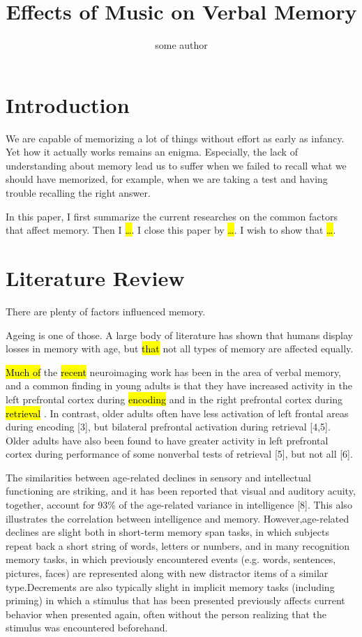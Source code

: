\documentclass{article}
\title{Effects of Music on Verbal Memory}
\author{some author}
\begin{document}
\maketitle{}

\section{Introduction}

We are capable of memorizing a lot of things without effort as early as infancy. Yet how it actually works remains an enigma. Especially, the lack of understanding about memory lead us to suffer when we failed to recall what we should have memorized, for example, when we are taking a test and having trouble recalling the right answer. 

In this paper, I first summarize the current researches on the common factors that affect memory. Then I \hl{\dots}. I close this paper by \hl{\dots}. I wish to show that \hl{\dots}.

\section{Literature Review}

There are plenty of factors influenced memory. 





Ageing is one of those. A large body of literature has shown that humans display losses in memory with age, but \hl{that} not all types of memory are affected equally. 

\hl{Much of}  the \hl{recent}  neuroimaging work has been in the area of verbal memory, and a common finding in young adults is that they have increased activity in the left prefrontal cortex during \hl{encoding}  and in the right prefrontal cortex during \hl{retrieval}  \autocite{cabezaImagingCognitionEmpirical1997,gradyc.l.NeuroimagingActivationFrontal1999}. In contrast, older adults often have less activation of left frontal areas during encoding [3], but bilateral prefrontal activation during retrieval [4,5]. Older adults have also been found to have greater activity in left prefrontal cortex during performance of some nonverbal tests of retrieval [5], but not all [6].

The similarities between age-related declines in sensory and intellectual functioning are striking, and it has been reported that visual and auditory acuity, together, account for 93\% of the age-related variance in intelligence [8]. This also illustrates the correlation between intelligence and memory. However,age-related declines are  slight both in short-term memory span tasks, in which subjects repeat back a short string of words, letters or  numbers, and in many recognition memory tasks, in which  previously encountered events (e.g. words, sentences, pictures, faces) are represented along with new distractor items of a similar type.Decrements are also typically slight in implicit memory tasks (including priming) in which a stimulus that has been presented previously affects current behavior when presented again, often without the person realizing that the stimulus was encountered beforehand. 
\end{document}
